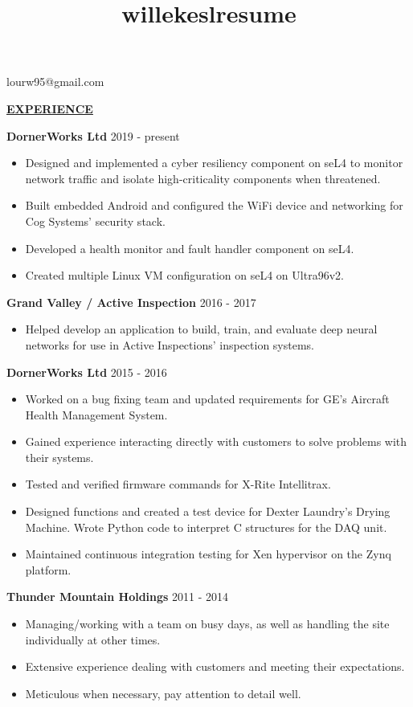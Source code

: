 \documentclass[12pt]{article}
\title{willekeslresume}
\newlength{\remaining}
\newcommand{\titleline}[1]{
\setlength{\remaining}{\textwidth-\widthof{\textsc{#1}}}
\noindent\underline{\textsc{#1}\hspace*{\remaining}}\par}
\begin{document}
{
     \hfill lourw95@gmail.com

    \vspace{\baselineskip}
    \titleline{\textbf{EXPERIENCE}}
    \noindent\textbf{DornerWorks Ltd} \hfill 2019 - present
    \begin{itemize}[noitemsep]
        \item Designed and implemented a cyber resiliency component on seL4 to monitor network
        traffic and isolate high-criticality components when threatened.
        \item Built embedded Android and configured the WiFi device and networking for Cog Systems'
        security stack.
        \item Developed a health monitor and fault handler component on seL4.
        \item Created multiple Linux VM configuration on seL4 on Ultra96v2.
    \end{itemize}

    \noindent\textbf{Grand Valley / Active Inspection} \hfill 2016 - 2017
    \begin{itemize}[noitemsep]
        \item Helped develop an application to build, train, and evaluate deep neural networks for
        use in Active Inspections' inspection systems.
    \end{itemize}

    \noindent\textbf{DornerWorks Ltd} \hfill 2015 - 2016
    \begin{itemize}[noitemsep]
        \item Worked on a bug fixing team and updated requirements for GE's Aircraft Health
        Management System.
        \item Gained experience interacting directly with customers to solve problems with their
        systems.
        \item Tested and verified firmware commands for X-Rite Intellitrax.
        \item Designed functions and created a test device for Dexter Laundry's Drying Machine.
        Wrote Python code to interpret C structures for the DAQ unit.
        \item Maintained continuous integration testing for Xen hypervisor on the Zynq platform.
    \end{itemize}

    \noindent\textbf{Thunder Mountain Holdings} \hfill 2011 - 2014
    \begin{itemize}[noitemsep]
        \item Managing/working with a team on busy days, as well as handling the site individually
        at other times.
        \item Extensive experience dealing with customers and meeting their expectations.
        \item Meticulous when necessary, pay attention to detail well.
    \end{itemize}

}
\end{document}
